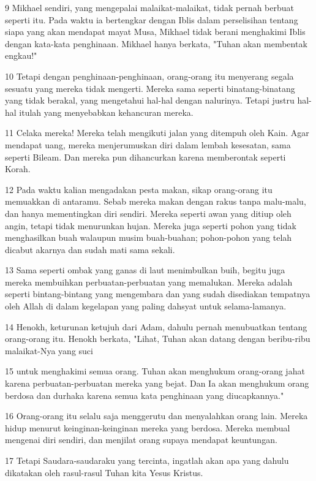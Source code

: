 \par 9 Mikhael sendiri, yang mengepalai malaikat-malaikat, tidak pernah berbuat seperti itu. Pada waktu ia bertengkar dengan Iblis dalam perselisihan tentang siapa yang akan mendapat mayat Musa, Mikhael tidak berani menghakimi Iblis dengan kata-kata penghinaan. Mikhael hanya berkata, "Tuhan akan membentak engkau!"
\par 10 Tetapi dengan penghinaan-penghinaan, orang-orang itu menyerang segala sesuatu yang mereka tidak mengerti. Mereka sama seperti binatang-binatang yang tidak berakal, yang mengetahui hal-hal dengan nalurinya. Tetapi justru hal-hal itulah yang menyebabkan kehancuran mereka.
\par 11 Celaka mereka! Mereka telah mengikuti jalan yang ditempuh oleh Kain. Agar mendapat uang, mereka menjerumuskan diri dalam lembah kesesatan, sama seperti Bileam. Dan mereka pun dihancurkan karena memberontak seperti Korah.
\par 12 Pada waktu kalian mengadakan pesta makan, sikap orang-orang itu memuakkan di antaramu. Sebab mereka makan dengan rakus tanpa malu-malu, dan hanya mementingkan diri sendiri. Mereka seperti awan yang ditiup oleh angin, tetapi tidak menurunkan hujan. Mereka juga seperti pohon yang tidak menghasilkan buah walaupun musim buah-buahan; pohon-pohon yang telah dicabut akarnya dan sudah mati sama sekali.
\par 13 Sama seperti ombak yang ganas di laut menimbulkan buih, begitu juga mereka membuihkan perbuatan-perbuatan yang memalukan. Mereka adalah seperti bintang-bintang yang mengembara dan yang sudah disediakan tempatnya oleh Allah di dalam kegelapan yang paling dahsyat untuk selama-lamanya.
\par 14 Henokh, keturunan ketujuh dari Adam, dahulu pernah menubuatkan tentang orang-orang itu. Henokh berkata, "Lihat, Tuhan akan datang dengan beribu-ribu malaikat-Nya yang suci
\par 15 untuk menghakimi semua orang. Tuhan akan menghukum orang-orang jahat karena perbuatan-perbuatan mereka yang bejat. Dan Ia akan menghukum orang berdosa dan durhaka karena semua kata penghinaan yang diucapkannya."
\par 16 Orang-orang itu selalu saja menggerutu dan menyalahkan orang lain. Mereka hidup menurut keinginan-keinginan mereka yang berdosa. Mereka membual mengenai diri sendiri, dan menjilat orang supaya mendapat keuntungan.
\par 17 Tetapi Saudara-saudaraku yang tercinta, ingatlah akan apa yang dahulu dikatakan oleh rasul-rasul Tuhan kita Yesus Kristus.
